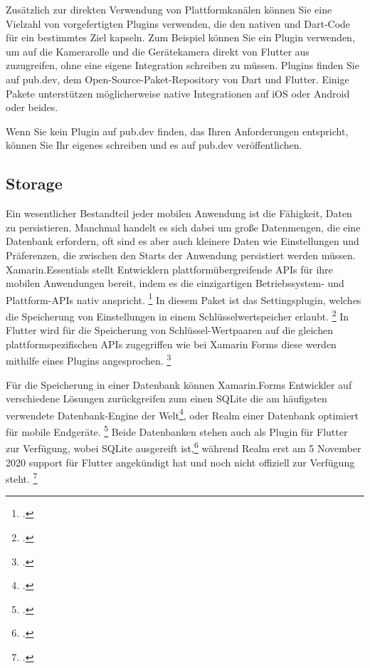 Zusätzlich zur direkten Verwendung von Plattformkanälen können Sie eine Vielzahl von vorgefertigten Plugins verwenden, die den nativen und Dart-Code für ein bestimmtes Ziel kapseln. Zum Beispiel können Sie ein Plugin verwenden, um auf die Kamerarolle und die Gerätekamera direkt von Flutter aus zuzugreifen, ohne eine eigene Integration schreiben zu müssen. Plugins finden Sie auf pub.dev, dem Open-Source-Paket-Repository von Dart und Flutter. Einige Pakete unterstützen möglicherweise native Integrationen auf iOS oder Android oder beides.

Wenn Sie kein Plugin auf pub.dev finden, das Ihren Anforderungen entspricht, können Sie Ihr eigenes schreiben und es auf pub.dev veröffentlichen.


\subsection{Storage}
Ein wesentlicher Bestandteil jeder mobilen Anwendung ist die Fähigkeit,  Daten zu persistieren.  Manchmal handelt es sich dabei um große Datenmengen,  die eine Datenbank erfordern,  oft sind es aber auch kleinere Daten wie Einstellungen und Präferenzen, die zwischen den Starts der Anwendung persistiert werden müssen.   
Xamarin.Essentials stellt Entwicklern plattformübergreifende APIs für ihre mobilen Anwendungen bereit,  indem es die einzigartigen Betriebssystem- und Plattform-APIs nativ anspricht. \footcite[Vgl.][Abgerufen am \today]{MicrosoftXamEssentials2020} In diesem Paket ist das Settingsplugin, welches die Speicherung von Einstellungen in einem Schlüsselwertspeicher erlaubt.  \footcite[Vgl.][Abgerufen am \today]{MicrosoftXamSettings2019} In Flutter wird für die Speicherung von Schlüssel-Wertpaaren auf die gleichen plattformspezifischen APIs zugegriffen wie bei Xamarin Forms diese werden mithilfe eines Plugins angesprochen.  \footcite[Vgl.][Abgerufen am \today]{GoogleFlutterSharedPreferences2020} 

Für die Speicherung in einer Datenbank können Xamarin.Forms Entwickler auf verschiedene Lösungen zurückgreifen zum einen SQLite  die am häufigsten verwendete Datenbank-Engine der Welt\footcite[Vgl.][Abgerufen am \today]{SQLiteConsortium2020},  oder Realm einer Datenbank optimiert für mobile Endgeräte. \footcite[Vgl.][Abgerufen am \today]{MongoDBRealm2020} Beide Datenbanken stehen auch als Plugin für Flutter zur Verfügung, wobei SQLite ausgereift ist,\footcite[Vgl.][Abgerufen am \today]{Tekartik2020} während Realm erst am 5 November 2020 support für Flutter angekündigt hat und noch nicht offiziell zur Verfügung steht. \footcite[Vgl.][Abgerufen am \today]{MongoDBFlutterSupport2020}



